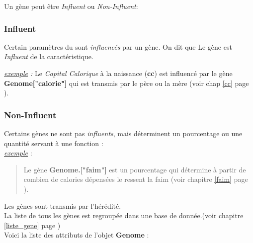 \documentclass[french]{report}
\begin{document}
Un gène peut être \textit{Influent} ou \textit{Non-Influent}:

\subsubsection{Influent}
Certain paramètres du \CoCiX sont \textit{influencés} par un gène. On dit que Le gène est \textit{Influent} de la caractéristique.

\textit{\underline{exemple} :}
Le \textit{Capital Calorique} à la naissance (\textbf{cc}) est influencé par le gène \textbf{Genome["calorie"]} qui est transmis par le père ou la mère (voir chap \ref{cc} page \pageref{cc}).\\

\subsubsection{Non-Influent}
Certains gènes ne sont pas \textit{influents}, mais déterminent un pourcentage  ou une quantité servant à une fonction : \\

\textit{\underline{exemple}} :
\begin{quote}
	Le gène \textbf{Genome.["faim"]} est un pourcentage qui détermine à partir de combien de calories dépensées le \CoCiX ressent la faim (voir chapitre \ref{faim} page \pageref{faim}).\\
\end{quote}

Les gènes sont transmis par l'hérédité.\\

La liste de tous les gènes est regroupée dans une base de donnée.(voir chapitre \ref{liste_gene} page \pageref{liste_gene}) \\ 
Voici la liste des attributs de l'objet \textbf{Genome} :
\end{document}
